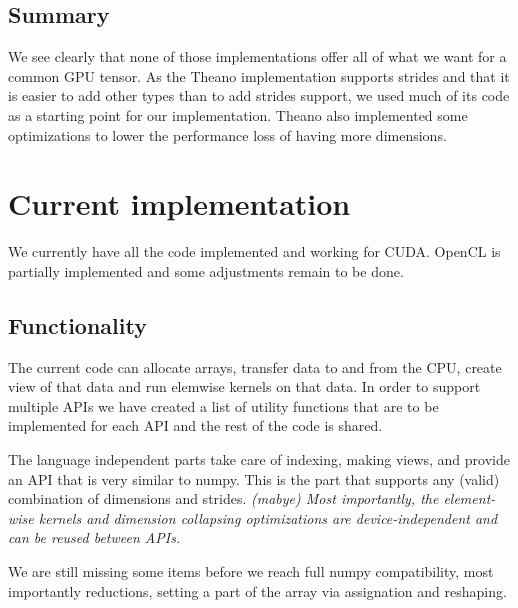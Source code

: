 \documentclass{article} %
\begin{document}
\subsection{Summary}
We see clearly that none of those implementations offer all of what we want for a common GPU tensor. As the Theano implementation supports strides and that it is easier to add other types than to add strides support, we used much of its code as a starting point for our implementation. Theano also implemented some optimizations to lower the performance loss of having more dimensions.

\section{Current implementation}

We currently have all the code implemented and working for CUDA.  
OpenCL is partially implemented and some adjustments remain to be done.  

\subsection{Functionality}

The current code can allocate arrays, transfer data to and from the CPU, create view of that data and run elemwise kernels on that data.  In order to support multiple APIs we have created a list of utility functions that are to be implemented for each API and the rest of the code is shared.

The language independent parts take care of indexing, making views, and provide an API that is very similar to numpy.  This is the part that supports any (valid) combination of dimensions and strides.  \emph{(mabye) Most importantly, the element-wise kernels and dimension collapsing optimizations are device-independent and can be reused between APIs.}

We are still missing some items before we reach full numpy compatibility, most importantly reductions, setting a part of the array via assignation and reshaping.

\end{document}
